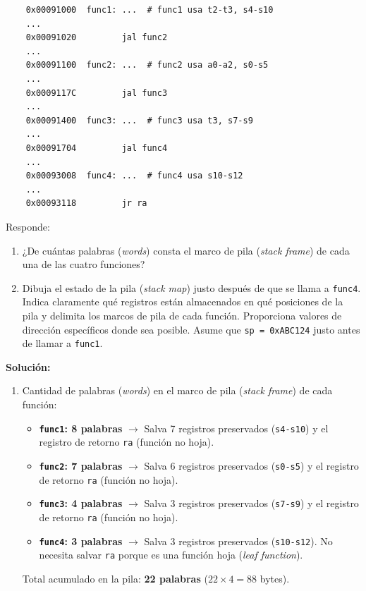 \documentclass[letterpaper,12pt]{article}
\begin{document}
\begin{enumerate}
    \begin{verbatim}
    0x00091000  func1: ...  # func1 usa t2-t3, s4-s10
    ...
    0x00091020         jal func2
    ...
    0x00091100  func2: ...  # func2 usa a0-a2, s0-s5
    ...
    0x0009117C         jal func3
    ...
    0x00091400  func3: ...  # func3 usa t3, s7-s9
    ...
    0x00091704         jal func4
    ...
    0x00093008  func4: ...  # func4 usa s10-s12
    ...
    0x00093118         jr ra
    \end{verbatim}
    
    Responde:
    \begin{enumerate}[label=\alph*)]
        \item ¿De cuántas palabras (\textit{words}) consta el marco de pila (\textit{stack frame}) de cada una de las cuatro funciones?
        \item Dibuja el estado de la pila (\textit{stack map}) justo después de que se llama a \texttt{func4}. Indica claramente qué registros están almacenados en qué posiciones de la pila y delimita los marcos de pila de cada función. Proporciona valores de dirección específicos donde sea posible. Asume que \texttt{sp = 0xABC124} justo antes de llamar a \texttt{func1}.
    \end{enumerate}

    \color{solcolor}
    \textbf{Solución:}
    \begin{enumerate}[label=\alph*)]
        \item Cantidad de palabras (\textit{words}) en el marco de pila (\textit{stack frame}) de cada función:
        \begin{itemize}[noitemsep]
            \item \textbf{\texttt{func1}: 8 palabras} $\rightarrow$ Salva 7 registros preservados (\texttt{s4-s10}) y el registro de retorno \texttt{ra} (función no hoja).
            \item \textbf{\texttt{func2}: 7 palabras} $\rightarrow$ Salva 6 registros preservados (\texttt{s0-s5}) y el registro de retorno \texttt{ra} (función no hoja).
            \item \textbf{\texttt{func3}: 4 palabras} $\rightarrow$ Salva 3 registros preservados (\texttt{s7-s9}) y el registro de retorno \texttt{ra} (función no hoja).
            \item \textbf{\texttt{func4}: 3 palabras} $\rightarrow$ Salva 3 registros preservados (\texttt{s10-s12}). No necesita salvar \texttt{ra} porque es una función hoja (\textit{leaf function}).
        \end{itemize}
        Total acumulado en la pila: \textbf{22 palabras} ($22 \times 4 = 88$ bytes).
        

\end{enumerate}
\end{enumerate}
\end{document}

